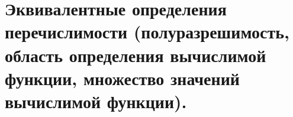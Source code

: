\section{Эквивалентные определения перечислимости (полуразрешимость, область определения вычислимой функции, множество значений вычислимой функции).}

\begin{definition}
  
\end{definition}